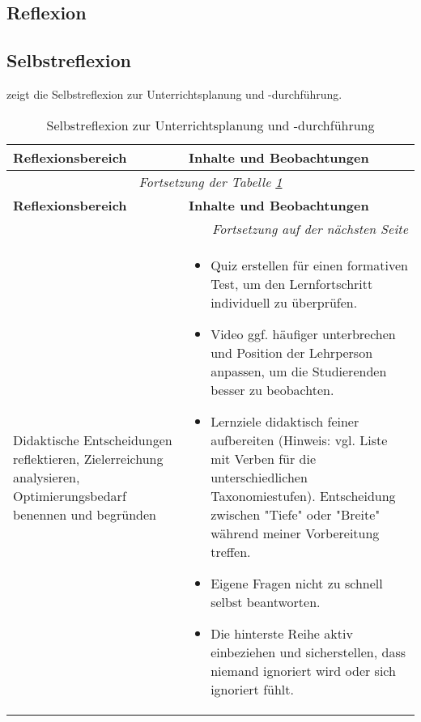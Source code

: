 \documentclass[
11pt,
captions=tableheading,
headsepline,
footsepline, 
captions=tableheading,
parskip=half-,
]{scrartcl}
\begin{document}
\begin{landscape}
    
    \section{Reflexion}
    \subsection{Selbstreflexion}
     zeigt die Selbstreflexion zur Unterrichtsplanung und -durchführung.
    
    \begin{longtable}{@{}p{8cm}|p{15cm}@{}}
        \caption{Selbstreflexion zur Unterrichtsplanung und -durchführung} \label{tab:Reflexion} \\ %
        \toprule
        \textbf{Reflexionsbereich} & \textbf{Inhalte und Beobachtungen} \\
        \midrule
        \endfirsthead %
        \multicolumn{2}{c}{\textit{Fortsetzung der Tabelle \ref{tab:Reflexion}}} \\
        \toprule
        \textbf{Reflexionsbereich} & \textbf{Inhalte und Beobachtungen} \\
        \midrule
        \endhead %
        \midrule
        \multicolumn{2}{r}{\textit{Fortsetzung auf der nächsten Seite}} \\
        \midrule
        \endfoot
        \bottomrule
        \endlastfoot
    
        Didaktische Entscheidungen reflektieren, Zielerreichung analysieren, Optimierungsbedarf benennen und begründen &
        \begin{itemize}
            \item Quiz erstellen für einen formativen Test, um den Lernfortschritt individuell zu überprüfen.
            \item Video ggf. häufiger unterbrechen und Position der Lehrperson anpassen, um die Studierenden besser zu beobachten.
            \item Lernziele didaktisch feiner aufbereiten (Hinweis: vgl. Liste mit Verben für die unterschiedlichen Taxonomiestufen). Entscheidung zwischen "Tiefe" oder "Breite" während meiner Vorbereitung treffen.
            \item Eigene Fragen nicht zu schnell selbst beantworten.
            \item Die hinterste Reihe aktiv einbeziehen und sicherstellen, dass niemand ignoriert wird oder sich ignoriert fühlt.
        \end{itemize} \\
        \midrule
    

\end{longtable}
\end{landscape}
\end{document}
